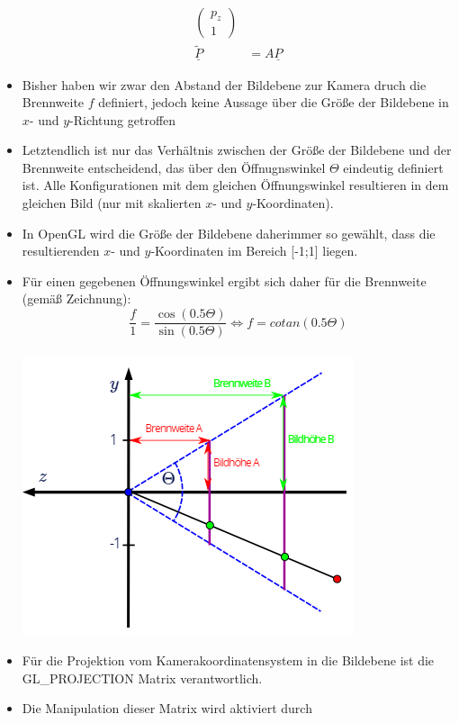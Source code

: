 \documentclass{scrartcl}
\begin{document}
\begin{itemize}
\begin{equation}
\begin{split}
\begin{pmatrix}
			p_z \\
			1
			\end{pmatrix} \\
			\underline{\widetilde{P}} &= A \underline{P}
		\end{split}
	\end{equation}
	\item Bisher haben wir zwar den Abstand der Bildebene zur Kamera druch die Brennweite $f$ definiert, jedoch keine Aussage über die Größe der Bildebene in $x$- und $y$-Richtung getroffen
	\item Letztendlich ist nur das Verhältnis zwischen der Größe der Bildebene und der Brennweite entscheidend, das über den Öffnugnswinkel $\Theta$ eindeutig definiert ist. Alle Konfigurationen mit dem gleichen Öffnungswinkel resultieren in dem gleichen Bild (nur mit skalierten $x$- und $y$-Koordinaten).
	\item In OpenGL wird die Größe der Bildebene daherimmer so gewählt, dass die resultierenden $x$- und $y$-Koordinaten im Bereich [-1;1] liegen.
	\item Für einen gegebenen Öffnungswinkel ergibt sich daher für die Brennweite (gemäß Zeichnung): \\
	\begin{equation}
	\frac{f}{1} = \frac{\cos (0.5 \Theta)}{\sin (0.5 \Theta)} \iff f = cotan (0.5 \Theta)
	\end{equation} \\
	\includegraphics[scale=0.5]{figures/projection_ysize.png}
	\item Für die Projektion vom Kamerakoordinatensystem in die Bildebene ist die GL\_PROJECTION Matrix verantwortlich.
	\item Die Manipulation dieser Matrix wird aktiviert durch \\

\end{itemize}
\end{document}
